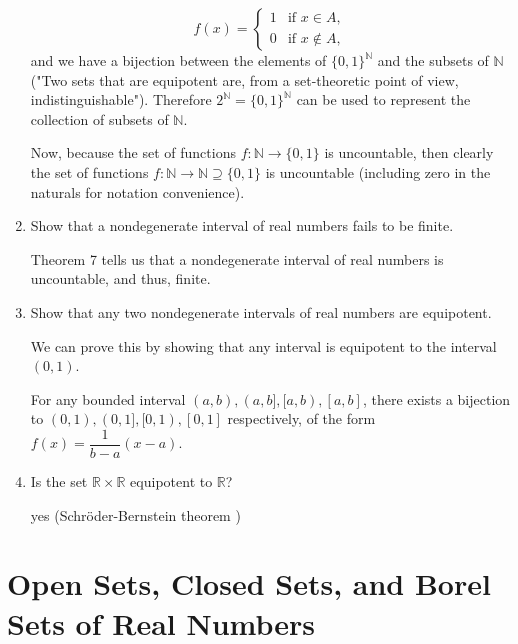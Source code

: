 \documentclass[a4paper,10pt]{book}
\theoremstyle{plain} %
\begin{document}
\begin{enumerate}
	\[
		f(x) =
	\begin{cases}
		1 & \text{if } x \in A,\\
		0 & \text{if } x \notin A,
	\end{cases}	
	\]
	and we have a bijection between the elements of $\{0,1\}^{\mathbb{N}}$ and the subsets of $\mathbb{N}$ ("Two sets that are equipotent are, from a set-theoretic point of view, indistinguishable").
	Therefore $2^{\mathbb{N}}= \{0,1\}^{\mathbb{N}}$ can be used to represent the collection of subsets of $\mathbb{N}$.\par
	Now, because the set of functions $f:\mathbb{N} \to \{0,1\}$ is uncountable, then clearly the set of functions $f:\mathbb{N} \to \mathbb{N} \supseteq \{0,1\}$ is uncountable (including zero in the naturals for notation convenience).
	\item Show that a nondegenerate interval of real numbers fails to be finite.\par
	Theorem 7 tells us that a nondegenerate interval of real numbers is uncountable, and thus, finite.	
	\item Show that any two nondegenerate intervals of real numbers are equipotent.\par
	We can prove this by showing that any interval is equipotent to the interval $(0,1)$.\par
	For any bounded interval $(a,b),(a,b],[a,b),[a,b]$, there exists a bijection to $(0,1),(0,1],[0,1),[0,1]$ respectively,
	of the form $f(x) = \dfrac{1}{b-a}(x-a)$.\par
	\item Is the set $\mathbb{R} \times \mathbb{R}$ equipotent to $\mathbb{R}$?\par
	yes (Schr\"oder-Bernstein theorem	)
\end{enumerate}

\section{Open Sets, Closed Sets, and Borel Sets of Real Numbers}
\end{document}
